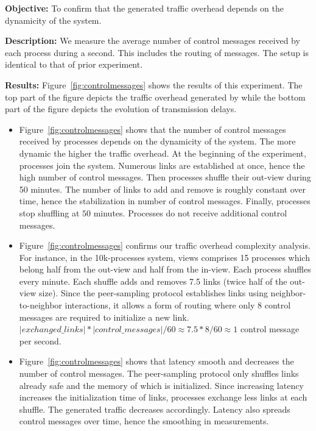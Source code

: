 \noindent \textbf{Objective:} To confirm that the generated traffic overhead
depends on the dynamicity of the system.

\noindent \textbf{Description:} We measure the average number of control
messages received by each process during a second. This includes the routing of
messages. The setup is identical to that of prior experiment.

\noindent \textbf{Results:} Figure~\ref{fig:controlmessages} shows the results of
this experiment. The top part of the figure depicts the traffic overhead
generated by \RPCBROADCAST while the bottom part of the figure depicts the
evolution of transmission delays.

\begin{itemize}[leftmargin=*]
\item Figure~\ref{fig:controlmessages} shows that the number of control messages
  received by processes depends on the dynamicity of the system. The more
  dynamic the higher the traffic overhead. At the beginning of the experiment,
  processes join the system. Numerous links are established at once, hence the
  high number of control messages. Then processes shuffle their out-view during
  50 minutes. The number of links to add and remove is roughly constant over
  time, hence the stabilization in number of control messages. Finally,
  processes stop shuffling at $50$ minutes. Processes do not receive additional
  control messages.
\item Figure~\ref{fig:controlmessages} confirms our traffic overhead complexity
  analysis. For instance, in the 10k-processes system, views comprises 15
  processes which belong half from the out-view and half from the in-view.  Each
  process shuffles every minute. Each shuffle adds and removes 7.5 links (twice
  half of the out-view size). Since the peer-sampling protocol establishes links
  using neighbor-to-neighbor interactions, it allows a form of routing where
  only 8 control messages are required to initialize a new link.
  $|exchanged\_links|*|control\_messages|/60 \approx 7.5*8/60 \approx 1$ control
  message per second.
\item Figure~\ref{fig:controlmessages} shows that latency smooth and decreases
  the number of control messages. The peer-sampling protocol only shuffles links
  already safe and the memory of which is initialized. Since increasing latency
  increases the initialization time of links, processes exchange less links at
  each shuffle. The generated traffic decreases accordingly. Latency also
  spreads control messages over time, hence the smoothing in measurements.
\end{itemize}

